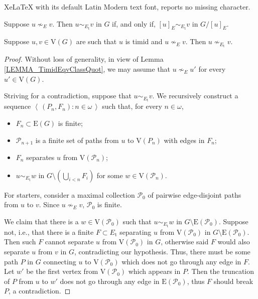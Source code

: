 \documentclass[10pt,a4paper]{amsart}
\newcommand{\seq}[1]{{\left\langle \, {#1} \,\right\rangle}}
\begin{document}
XeLaTeX with its default Latin Modern text font, reports no missing character.
\begin{lemma}\label{LEMMA_TimidEqvClassQuot}
    Suppose $u\nsim_E v$. Then $u\sim_{E_\mathrm{t}} v$ in $G$ if, and only if, $[u]_E\sim_{E_\mathrm{t}} v$ in $G/[u]_E$.
\end{lemma}

\begin{lemma}\label{LEMMA_TimidEdgeSeparation}
    Suppose $u,v\in \mathrm{V}(G)$ are such that $u$ is timid and $u\nsim_E v$. Then $u\nsim_{E_\mathrm{t}} v$.
\end{lemma}

\begin{proof}
    Without loss of generality, in view of Lemma \ref{LEMMA_TimidEqvClassQuot}, we may assume that $u\nsim_E u'$ for every $u'\in \mathrm{V}(G)$.

    Striving for a contradiction, suppose that $u\sim_{E_\mathrm{t}}v$. We recursively construct a sequence $\seq{(P_n,F_n):{n\in\omega}}$ such that, for every $n\in\omega$, 
    \begin{itemize}
        \item[(i)] $F_n\subset \mathrm{E}(G)$ is finite;
        \item[(ii)] $\mathcal P_{n+1}$ is a finite set of paths from $u$ to $\mathrm{V}(P_n)$ with edges in $F_n$;
        \item[(iii)] $F_{n}$ separates $u$ from $\mathrm{V}(\mathcal P_n)$; 
        \item[(iv)] $u\sim_{E_\mathrm{t}} w$ in $G\setminus \left(\bigcup_{i< n}F_i\right)$ for some $w\in \mathrm{V}(\mathcal P_n)$. 
    \end{itemize}
    
    For starters, consider a maximal collection $\mathcal P_0$ of pairwise edge-disjoint paths from $u$ to $v$. Since $u\nsim_E v$, $\mathcal P_0$ is finite. 
    
    We claim that there is a $w\in \mathrm{V}(\mathcal P_0)$ such that $u\sim_{E_\mathrm{t}} w$ in $G\setminus \mathrm{E}(\mathcal P_0)$. Suppose not, i.e., that there is a finite $F\subset E_\mathrm{t}$ separating $u$ from $\mathrm{V}(\mathcal P_0)$ in $G\setminus \mathrm{E}(\mathcal P_0)$. Then such $F$ cannot separate $u$ from $\mathrm{V}(\mathcal P_0)$ in $G$, otherwise said $F$ would also separate $u$ from $v$ in $G$, contradicting our hypothesis. Thus, there must be some path $P$ in $G$ connecting $u$ to $\mathrm{V}(\mathcal P_0)$ which does not go through any edge in $F$. Let $w'$ be the first vertex from $\mathrm{V}(\mathcal P_0)$ which appears in $P$. Then the truncation of $P$ from $u$ to $w'$ does not go through any edge in $\mathrm{E}(\mathcal P_0)$, thus $F$ should break $P$, a contradiction. 
    

\end{proof}
\end{document}
